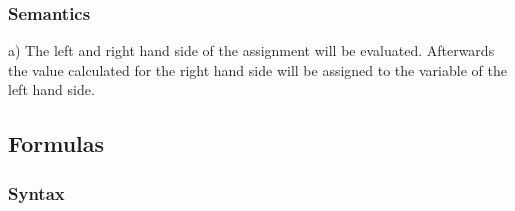 \documentclass [a4paper,12pt,fleqn]{article}
\begin{document}
\subsubsection*{Semantics}
\begin{list}{-}{}
\item[a)]
The left and right hand side of the assignment will be evaluated.
Afterwards the value calculated for the right hand side will be
assigned to the variable of the left hand side.
\end{list}
\subsection {Formulas}
\subsubsection*{Syntax}
\end{document}
